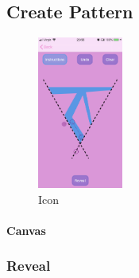\documentclass[11pt]{article}
\begin{document}
            \subsection{Create Pattern}
             \begin{figure}
                        \centering
                        \includegraphics[width=0.25\textwidth]{KiriZen/createPattern.png}
                        \caption{Icon}
                        \label{fig:kiriZen-createPattern}
                    \end{figure}
            \paragraph{Canvas}

        

            \paragraph{} 
      


    \subsubsection{Reveal}
    
            \paragraph{}
            
\end{document}
